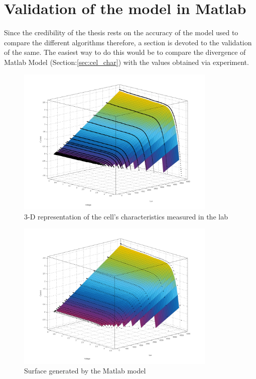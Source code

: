\section {Validation of the model in Matlab{\textregistered}}\label{sec:Validation} 

Since the credibility of the thesis rests on the accuracy of the model used to compare the different algorithms therefore, a section is devoted to the validation of the same. The easiest way to do this would be to compare the divergence of Matlab Model (Section:\ref{sec:cel_char}) with the values obtained via experiment.\\

\begin{figure}[H]
	  \begin{center}
		  \includegraphics[width=0.85\textwidth]{images/IVLUX_LAB_measured}
		  \caption{3-D representation of the cell's characteristics measured in the lab }
		  \label{fig:IVLUX_LAB_measured}
	  \end{center}
  \end{figure}

\begin{figure}[H]
  \begin{center}
	  \includegraphics[width=0.85\textwidth]{images/IVLUX_MOD_gen}
	  \caption{Surface generated by the Matlab model}
	  \label{fig:IVLUX_MOD_gen}
  \end{center}
\end{figure}

